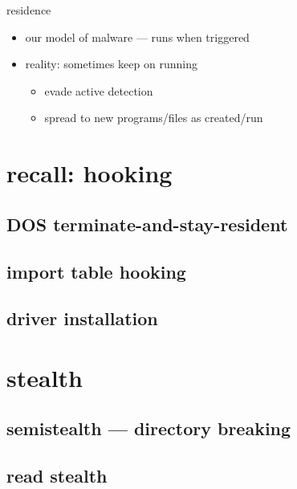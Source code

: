 \begin{frame}{residence}
    \begin{itemize}
    \item our model of malware --- runs when triggered
    \item reality: sometimes keep on running
        \begin{itemize}
        \item evade active detection
        \item spread to new programs/files as created/run
        \end{itemize}
    \end{itemize}
\end{frame}

\section{recall: hooking}


\subsection{DOS terminate-and-stay-resident}

\subsection{import table hooking}

\subsection{driver installation}

\section{stealth}

\subsection{semistealth --- directory breaking}


\subsection{read stealth}


